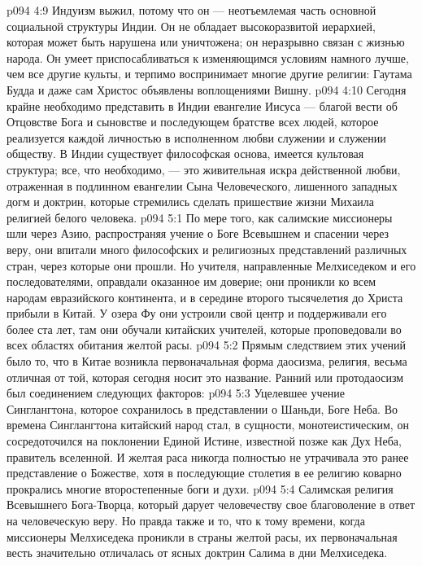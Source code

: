 \vs p094 4:9 Индуизм выжил, потому что он --- неотъемлемая часть основной социальной структуры Индии. Он не обладает высокоразвитой иерархией, которая может быть нарушена или уничтожена; он неразрывно связан с жизнью народа. Он умеет приспосабливаться к изменяющимся условиям намного лучше, чем все другие культы, и терпимо воспринимает многие другие религии: Гаутама Будда и даже сам Христос объявлены воплощениями Вишну.
\vs p094 4:10 Сегодня крайне необходимо представить в Индии евангелие Иисуса --- благой вести об Отцовстве Бога и сыновстве и последующем братстве всех людей, которое реализуется каждой личностью в исполненном любви служении и служении обществу. В Индии существует философская основа, имеется культовая структура; все, что необходимо, --- это живительная искра действенной любви, отраженная в подлинном евангелии Сына Человеческого, лишенного западных догм и доктрин, которые стремились сделать пришествие жизни Михаила религией белого человека.
\vs p094 5:1 По мере того, как салимские миссионеры шли через Азию, распространяя учение о Боге Всевышнем и спасении через веру, они впитали много философских и религиозных представлений различных стран, через которые они прошли. Но учителя, направленные Мелхиседеком и его последователями, оправдали оказанное им доверие; они проникли ко всем народам евразийского континента, и в середине второго тысячелетия до Христа прибыли в Китай. У озера Фу они устроили свой центр и поддерживали его более ста лет, там они обучали китайских учителей, которые проповедовали во всех областях обитания желтой расы.
\vs p094 5:2 Прямым следствием этих учений было то, что в Китае возникла первоначальная форма даосизма, религия, весьма отличная от той, которая сегодня носит это название. Ранний или протодаосизм был соединением следующих факторов:
\vs p094 5:3 \bibnobreakspace Уцелевшее учение Синглангтона, которое сохранилось в представлении о Шаньди, Боге Неба. Во времена Синглангтона китайский народ стал, в сущности, монотеистическим, он сосредоточился на поклонении Единой Истине, известной позже как Дух Неба, правитель вселенной. И желтая раса никогда полностью не утрачивала это ранее представление о Божестве, хотя в последующие столетия в ее религию коварно прокрались многие второстепенные боги и духи.
\vs p094 5:4 \bibnobreakspace Салимская религия Всевышнего Бога\hyp{}Творца, который дарует человечеству свое благоволение в ответ на человеческую веру. Но правда также и то, что к тому времени, когда миссионеры Мелхиседека проникли в страны желтой расы, их первоначальная весть значительно отличалась от ясных доктрин Салима в дни Мелхиседека.
